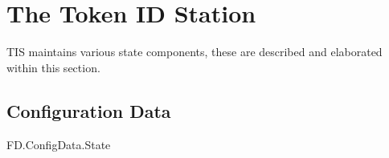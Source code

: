 
\chapter{The Token ID Station}
\label{sec:TIS}
TIS maintains various state components, these are described and
elaborated within this section. 

\section{Configuration Data}

\begin{traceunit}{FD.ConfigData.State}
\end{traceunit}

